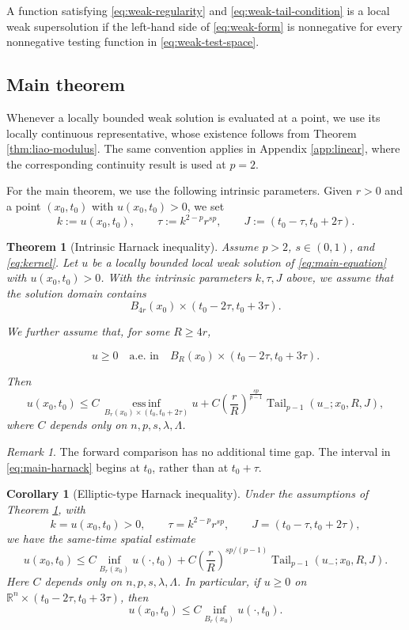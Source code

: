 \documentclass[10pt]{amsart}
\theoremstyle{plain}
\newtheorem{theorem}[lemma]{Theorem}
\newtheorem{corollary}[lemma]{Corollary}
\theoremstyle{definition}
\theoremstyle{remark}
\newtheorem{remark}[lemma]{Remark}
\numberwithin{equation}{section}
\newcommand{\R}{\mathbb R}
\begin{document}
A function satisfying \eqref{eq:weak-regularity} and
\eqref{eq:weak-tail-condition} is a local weak supersolution if the left-hand
side of \eqref{eq:weak-form} is nonnegative for every nonnegative testing
function in \eqref{eq:weak-test-space}.


\subsection{Main theorem}

Whenever a locally bounded weak solution is evaluated at a point, we
use its locally continuous representative, whose existence follows
from Theorem \ref{thm:liao-modulus}. The same convention applies in
Appendix \ref{app:linear}, where the corresponding continuity result
is used at $p=2$.

For the main theorem, we use the following intrinsic parameters.
Given $r>0$ and a point $(x_0,t_0)$ with $u(x_0,t_0)>0$, we set
\[
k:=u(x_0,t_0),\qquad
\tau:=k^{2-p}r^{sp},\qquad
J:=(t_0-\tau,t_0+2\tau).
\]

\begin{theorem}[Intrinsic Harnack inequality]\label{thm:main}
Assume $p>2$, $s\in(0,1)$, and \eqref{eq:kernel}. Let $u$ be a locally
bounded local weak solution of \eqref{eq:main-equation} with
$u(x_0,t_0)>0$. With the intrinsic parameters $k,\tau,J$ above,
we assume that the solution domain contains
\[
    B_{4r}(x_0)\times(t_0-2\tau,t_0+3\tau).
\]

We further assume that, for some $R\ge4r$,

\[
    u\ge0
    \quad\text{a.e. in}\quad
    B_R(x_0)\times(t_0-2\tau,t_0+3\tau).
\]

Then
\begin{equation}\label{eq:main-harnack}
u(x_0,t_0)
\le
C\,
\operatorname*{ess\,inf}_{B_r(x_0)\times(t_0,t_0+2\tau)}u
+
C
\left(\frac rR\right)^{\frac{sp}{p-1}}
\operatorname{Tail}_{p-1}(u_-;x_0,R,J),
\end{equation}
where $C$ depends only on $n,p,s,\lambda,\Lambda$.
\end{theorem}

\begin{remark}
\label{rem:no-forward-gap}
The forward comparison has no additional time gap.
The interval in \eqref{eq:main-harnack} begins at $t_0$, rather than
at $t_0+\tau$. 
\end{remark}

\begin{corollary}[Elliptic-type Harnack inequality]
\label{cor:elliptic-type}
Under the assumptions of Theorem \ref{thm:main}, with
\[
k=u(x_0,t_0)>0,\qquad
\tau=k^{2-p}r^{sp},\qquad J=(t_0-\tau,t_0+2\tau),
\]
we have the same-time spatial estimate
\begin{equation}\label{eq:same-time-harnack}
u(x_0,t_0)
\le C\inf_{B_r(x_0)}u(\cdot,t_0)
+C\left(\frac rR\right)^{sp/(p-1)}
\operatorname{Tail}_{p-1}(u_-;x_0,R,J).
\end{equation}
Here $C$ depends only on $n,p,s,\lambda,\Lambda$. In particular, if
$u\ge0$ on $\R^n\times(t_0-2\tau,t_0+3\tau)$, then
\[
u(x_0,t_0)\le C\inf_{B_r(x_0)}u(\cdot,t_0).
\]
\end{corollary}
\end{document}
